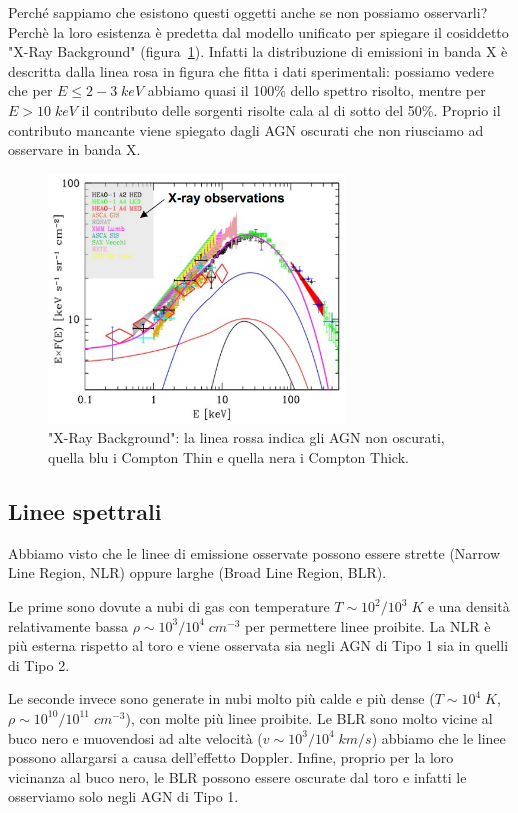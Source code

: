 Perché sappiamo che esistono questi oggetti anche se non possiamo osservarli? Perchè la loro esistenza è predetta dal modello unificato per spiegare il cosiddetto "X-Ray Background" (figura~\ref{fig:xrb-agn}). Infatti la distribuzione di emissioni in banda X è descritta dalla linea rosa in figura che fitta i dati sperimentali: possiamo vedere che per $E \leq 2-3 \;\si{keV}$ abbiamo quasi il 100\% dello spettro risolto, mentre per $E > 10 \;\si{keV}$ il contributo delle sorgenti risolte cala al di sotto del 50\%. Proprio il contributo mancante viene spiegato dagli AGN oscurati che non riusciamo ad osservare in banda X.

\begin{figure}
    \centering
    \includegraphics[width = 0.7\textwidth]{immagini/xrb-agn.png}
    \caption{"X-Ray Background": la linea rossa indica gli AGN non oscurati, quella blu i Compton Thin e quella nera i Compton Thick.}
    \label{fig:xrb-agn}
\end{figure}

\subsection{Linee spettrali}
Abbiamo visto che le linee di emissione osservate possono essere strette (Narrow Line Region, NLR) oppure larghe (Broad Line Region, BLR). 

Le prime sono dovute a nubi di gas con temperature $T \sim 10^2/10^3 \;\si{K}$ e una densità relativamente bassa $\rho \sim 10^3/10^4 \;\si{cm^{-3}}$ per permettere linee proibite. La NLR è più esterna rispetto al toro e viene osservata sia negli AGN di Tipo 1 sia in quelli di Tipo 2. 

Le seconde invece sono generate in nubi molto più calde e più dense ($T\sim 10^4 \;\si{K}$, $\rho \sim 10^{10}/10^{11} \;\si{cm^{-3}}$), con molte più linee proibite. Le BLR sono molto vicine al buco nero e muovendosi ad alte velocità ($v \sim 10^3/10^4 \;\si{km}/\si{s}$) abbiamo che le linee possono allargarsi a causa dell'effetto Doppler. Infine, proprio per la loro vicinanza al buco nero, le BLR possono essere oscurate dal toro e infatti le osserviamo solo negli AGN di Tipo 1.

